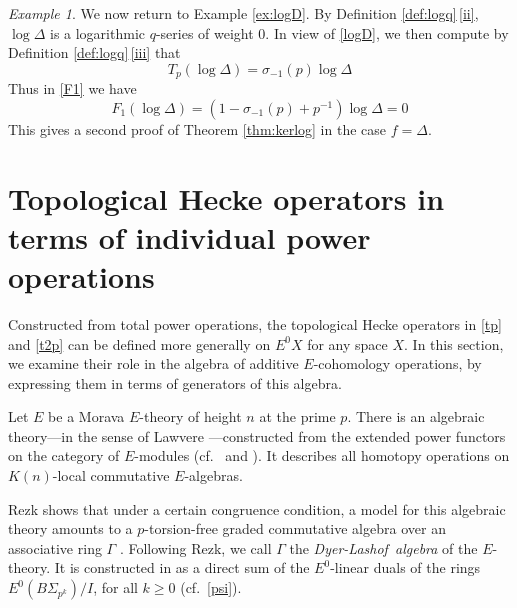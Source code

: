 \documentclass{gtpart}
\theoremstyle{definition}
\theoremstyle{remark}
\newtheorem{ex}[thm]{Example}
\newcommand{\DL}{Dyer-Lashof~}
\renewcommand{\D}{\Delta}
\newcommand{\G}{\Gamma}
\newcommand{\si}{\sigma}
\renewcommand{\=}{\approx}
\renewcommand{\-}{\sim}
\numberwithin{equation}{section}
\numberwithin{thm}{section}
\begin{document}
\begin{ex}
 \label{ex:pf}
 We now return to Example \ref{ex:logD}.  By Definition 
 \ref{def:logq}\,\eqref{ii}, $\log \D$ is a logarithmic $q$-series of weight 0.  
 In view of \eqref{logD}, we then compute by Definition 
 \ref{def:logq}\,\eqref{iii} that 
 \[
  T_p (\log \D) = \si_{-1}(p) \log \D 
 \]
 Thus in \eqref{F1} we have 
 \[
  F_1 (\log \D) = \left( 1 - \si_{-1}(p) + p^{-1} \right) \log \D = 0 
 \]
 This gives a second proof of Theorem \ref{thm:kerlog} in the case $f = \D$.  
\end{ex}



\section{Topological Hecke operators in terms of individual power operations}
\label{sec:individual}

Constructed from total power operations, the topological Hecke operators in 
\eqref{tp} and \eqref{t2p} can be defined more generally on $E^0 X$ for any 
space $X$.  In this section, we examine their role in the algebra of additive 
$E$-cohomology operations, by expressing them in terms of generators of this 
algebra.  

Let $E$ be a Morava $E$-theory of height $n$ at the prime $p$.  There is an 
algebraic theory---in the sense of Lawvere \cite{Lawvere}---constructed from the 
extended power functors on the category of $E$-modules 
(cf.~\cite[Section 9]{lpo} and \cite[Section 4]{cong}).  It describes all 
homotopy operations on $K(n)$-local commutative $E$-algebras.  

Rezk shows that under a certain congruence condition, a model for this algebraic 
theory amounts to a $p$-torsion-free graded commutative algebra over an 
associative ring $\G$ \cite[Theorem A]{cong}.  Following Rezk, we call $\G$ the 
{\em \DL algebra} of the $E$-theory.  It is constructed in \cite[6.2]{cong} as a 
direct sum of the $E^0$-linear duals of the rings $E^0(B\Sigma_{p^k}) / I$, for 
all $k \geq 0$ (cf.~\eqref{psi}).  
\end{document}
